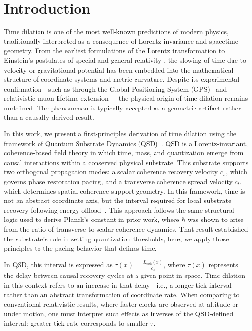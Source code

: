 \documentclass[entropy,article,submit,pdftex,moreauthors]{Definitions/mdpi}
\begin{document}



\section{Introduction}

Time dilation is one of the most well-known predictions of modern physics, traditionally interpreted as a consequence of Lorentz invariance and spacetime geometry. From the earliest formulations of the Lorentz transformation to Einstein’s postulates of special\cite{einstein1905} and general relativity \cite{einstein1915}, the slowing of time due to velocity or gravitational potential has been embedded into the mathematical structure of coordinate systems and metric curvature. Despite its experimental confirmation—such as through the Global Positioning System (GPS)~\cite{ashby-gps} and relativistic muon lifetime extension~\cite{bailey-muon}—the physical origin of time dilation remains undefined. The phenomenon is typically accepted as a geometric artifact rather than a causally derived result.

In this work, we present a first-principles derivation of time dilation using the framework of Quantum Substrate Dynamics (QSD)~\cite{bush2025}. QSD is a Lorentz-invariant, coherence-based field theory in which time, mass, and quantization emerge from causal interactions within a conserved physical substrate. This substrate supports two orthogonal propagation modes: a scalar coherence recovery velocity \( c_s \), which governs phase restoration pacing, and a transverse coherence spread velocity \( c_t \), which determines spatial coherence support geometry. In this framework, time is not an abstract coordinate axis, but the interval required for local substrate recovery following energy offload~\cite{bush-planck-2025}. This approach follows the same structural logic used to derive Planck’s constant in prior work, where \( \hbar \) was shown to arise from the ratio of transverse to scalar coherence dynamics. That result established the substrate’s role in setting quantization thresholds; here, we apply those principles to the pacing behavior that defines time.

In QSD, this interval is expressed as \( \tau(x) = \frac{L_{\text{coh}}(x)}{c_s} \), where \( \tau(x) \) represents the delay between causal recovery cycles at a given point in space. Time dilation in this context refers to an increase in that delay—i.e., a longer tick interval—rather than an abstract transformation of coordinate rate. When comparing to conventional relativistic results, where faster clocks are observed at altitude or under motion, one must interpret such effects as inverses of the QSD-defined interval: greater tick rate corresponds to smaller \( \tau \).
\end{document}
